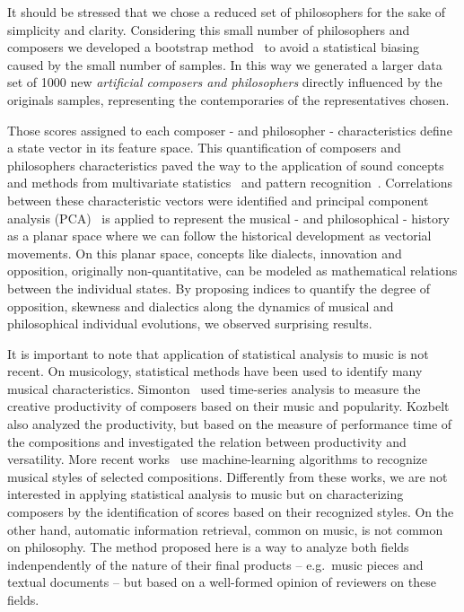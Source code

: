 \documentclass[
 aip,
 jmp,
 amsmath,amssymb,
 reprint,
]{revtex4-1}
\begin{document}
It should be stressed that we chose a reduced set of philosophers for the
sake of simplicity and clarity. Considering this
small number of philosophers and composers we developed a bootstrap method~\cite{Varian} to avoid a statistical biasing caused by the small number of samples. In this way we generated a larger data set of 1000 new \emph{artificial composers and philosophers} directly influenced by the originals samples, representing the contemporaries of the representatives chosen.

Those scores assigned to each composer - and philosopher - characteristics define a state vector in its feature space. This quantification of composers and philosophers characteristics paved the way to the application of sound concepts and methods from multivariate statistics~\cite{Papoulis, Wichern,
Therrien} and pattern recognition~\cite{Duda, Costa}. Correlations between these characteristic vectors were identified and principal component
analysis (PCA)~\cite{Costa} is applied to
represent the musical - and philosophical - history as a planar space where we can follow the historical development as vectorial movements. On this planar space, concepts like dialects, innovation and opposition, originally non-quantitative, can be modeled as mathematical relations between the individual states. By proposing indices to quantify the
degree of opposition, skewness and dialectics along the dynamics of
musical and philosophical individual evolutions, we observed surprising results.

It is important to note that application of statistical analysis to
music is not recent. On musicology, statistical methods have been used
to identify many musical characteristics.
Simonton~\cite{Simonton1991829, Simonton1977791} used time-series analysis to measure the creative productivity
of composers based on their music and popularity. Kozbelt~\cite{Kozbelt01012009, Kozbelt01012007} also
analyzed the productivity, but based on the measure of performance
time of the compositions and investigated the relation between
productivity and versatility. More recent works~\cite{Kranenburg2004, Kranenburg2007} use machine-learning
algorithms to recognize musical styles of selected compositions. 
Differently from these works, we are not interested in applying
statistical analysis to music but on characterizing composers by the identification of scores based on their recognized styles. On the other hand, automatic information retrieval, common on music, is not common on philosophy. The method proposed here is a way to analyze both fields indenpendently of the nature of their final products -- e.g.\ music pieces and textual documents -- but based on a well-formed opinion of reviewers on these fields.
\end{document}
